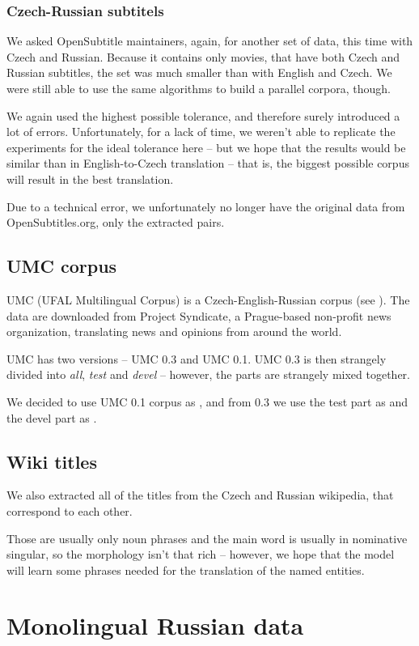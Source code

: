 \subsubsection{Czech-Russian subtitels}

We asked OpenSubtitle maintainers, again, for another set of data, this time with Czech and Russian.
Because it contains only movies, that have both Czech and Russian subtitles, the set was much smaller than with English and Czech. We were still able to use the same algorithms to build a parallel corpora, though.

We again used the highest possible tolerance, and therefore surely introduced a lot of errors. Unfortunately, for a lack of time, we weren't able to replicate the experiments for the ideal tolerance here -- but we hope that the results would be similar than in English-to-Czech translation -- that is, the biggest possible corpus will result in the best translation.

Due to a technical error, we unfortunately no longer have the original data from OpenSubtitles.org, only the extracted pairs. 
\subsection{UMC corpus}
UMC (UFAL Multilingual Corpus) is a Czech-English-Russian corpus (see \cite{umc}). The data are downloaded from Project Syndicate, a Prague-based non-profit news organization, translating news and opinions from around the world.

UMC has two versions -- UMC 0.3 and UMC 0.1. UMC 0.3 is then strangely divided into \emph{all}, \emph{test} and \emph{devel} -- however, the parts are strangely mixed together.

We decided to use UMC 0.1 corpus as , and from 0.3 we use the test part as  and the devel part as .



\subsection{Wiki titles}
We also extracted all of the titles from the Czech and Russian wikipedia, that correspond to each other.

Those are usually only noun phrases and the main word is usually in nominative singular, so the morphology isn't that rich -- however, we hope that the model will learn some phrases needed for the translation of the named entities.
\section{Monolingual Russian data}
